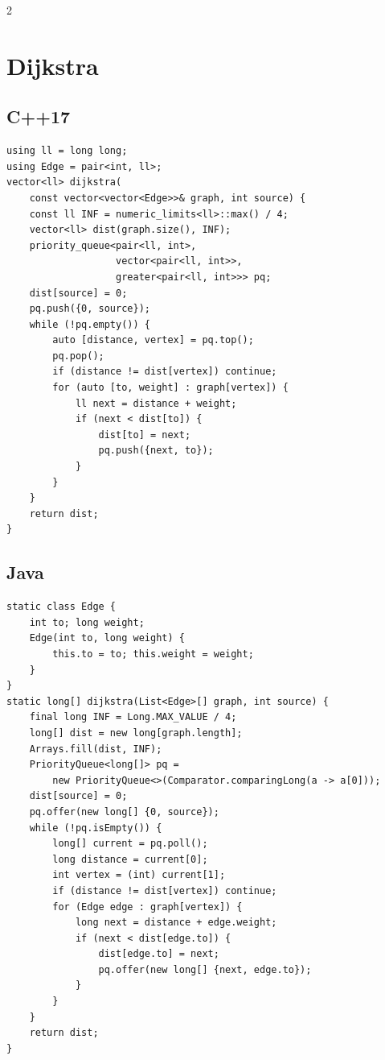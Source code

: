 \documentclass[10pt]{article}
\begin{document}
\begin{multicols}{2}

\section{Dijkstra}
\subsection{C++17}
\begin{framed}
\scriptsize
\begin{verbatim}
using ll = long long;
using Edge = pair<int, ll>;
vector<ll> dijkstra(
    const vector<vector<Edge>>& graph, int source) {
    const ll INF = numeric_limits<ll>::max() / 4;
    vector<ll> dist(graph.size(), INF);
    priority_queue<pair<ll, int>,
                   vector<pair<ll, int>>,
                   greater<pair<ll, int>>> pq;
    dist[source] = 0;
    pq.push({0, source});
    while (!pq.empty()) {
        auto [distance, vertex] = pq.top();
        pq.pop();
        if (distance != dist[vertex]) continue;
        for (auto [to, weight] : graph[vertex]) {
            ll next = distance + weight;
            if (next < dist[to]) {
                dist[to] = next;
                pq.push({next, to});
            }
        }
    }
    return dist;
}
\end{verbatim}
\end{framed}

\subsection{Java}
\begin{framed}
\scriptsize
\begin{verbatim}
static class Edge {
    int to; long weight;
    Edge(int to, long weight) {
        this.to = to; this.weight = weight;
    }
}
static long[] dijkstra(List<Edge>[] graph, int source) {
    final long INF = Long.MAX_VALUE / 4;
    long[] dist = new long[graph.length];
    Arrays.fill(dist, INF);
    PriorityQueue<long[]> pq =
        new PriorityQueue<>(Comparator.comparingLong(a -> a[0]));
    dist[source] = 0;
    pq.offer(new long[] {0, source});
    while (!pq.isEmpty()) {
        long[] current = pq.poll();
        long distance = current[0];
        int vertex = (int) current[1];
        if (distance != dist[vertex]) continue;
        for (Edge edge : graph[vertex]) {
            long next = distance + edge.weight;
            if (next < dist[edge.to]) {
                dist[edge.to] = next;
                pq.offer(new long[] {next, edge.to});
            }
        }
    }
    return dist;
}
\end{verbatim}
\end{framed}


\end{multicols}
\end{document}
